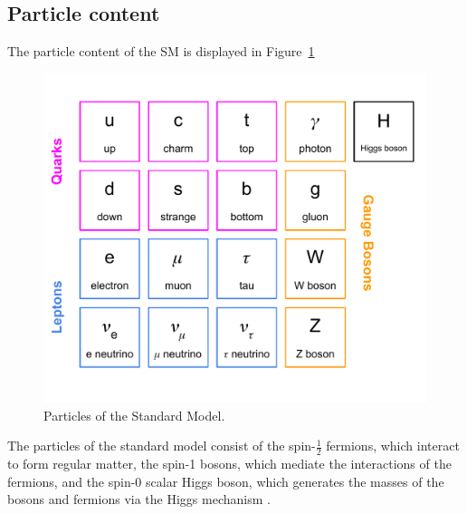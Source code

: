 \subsection{Particle content}\label{sec:smpart}

The particle content of the SM is displayed in Figure~\ref{fig:smparticles}

\begin{figure}[tbh]
\centering
\includegraphics[width=5in]{figures/smparticles.pdf}
\caption{Particles of the Standard Model.}
\label{fig:smparticles}
\end{figure}

The particles of the standard model consist of the spin-$\frac{1}{2}$ fermions, which interact to form regular matter, the spin-1 bosons, which mediate the interactions of the fermions, and the spin-0 scalar Higgs boson, which generates the masses of the bosons and fermions via the Higgs mechanism \cite{Bettini}.

